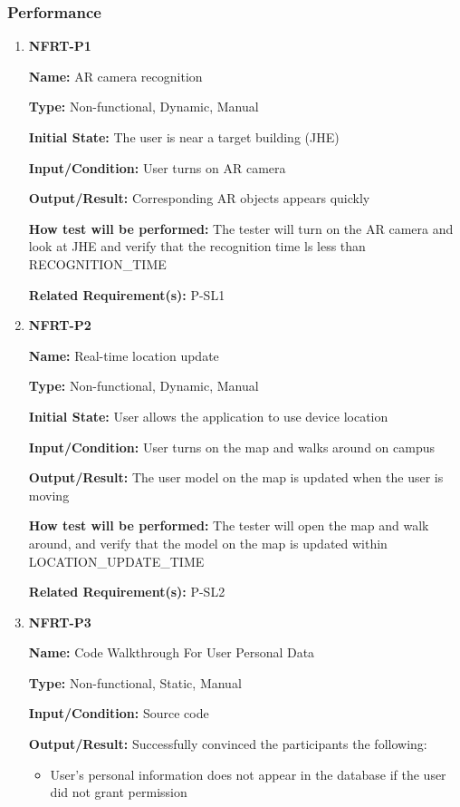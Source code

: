 \documentclass[12pt, titlepage]{article}
\begin{document}
\subsubsection{Performance}

\begin{enumerate}
\item{\textbf{NFRT-P1}}

\textbf{Name:} AR camera recognition

\textbf{Type:} Non-functional, Dynamic, Manual
					
\textbf{Initial State:} The user is near a target building (JHE)
					
\textbf{Input/Condition:} User turns on AR camera
					
\textbf{Output/Result:} Corresponding AR objects appears quickly

\textbf{How test will be performed:} The tester will turn on the AR camera and look at JHE and verify that the recognition time ls less than RECOGNITION\_TIME

\textbf{Related Requirement(s):} P-SL1

\item{\textbf{NFRT-P2}}

\textbf{Name:} Real-time location update

\textbf{Type:} Non-functional, Dynamic, Manual
					
\textbf{Initial State:} User allows the application to use device location
					
\textbf{Input/Condition:} User turns on the map and walks around on campus
					
\textbf{Output/Result:} The user model on the map is updated when the user is moving

\textbf{How test will be performed:} The tester will open the map and walk around, and verify that the model on the map is updated within LOCATION\_UPDATE\_TIME

\textbf{Related Requirement(s):} P-SL2

\item{\textbf{NFRT-P3}}

\textbf{Name:} Code Walkthrough For User Personal Data

\textbf{Type:} Non-functional, Static, Manual

\textbf{Input/Condition:} Source code

\textbf{Output/Result:} Successfully convinced the participants the following:
\begin{itemize}
  \item User's personal information does not appear in the database if the user did not grant permission
\end{itemize}


\end{enumerate}
\end{document}
